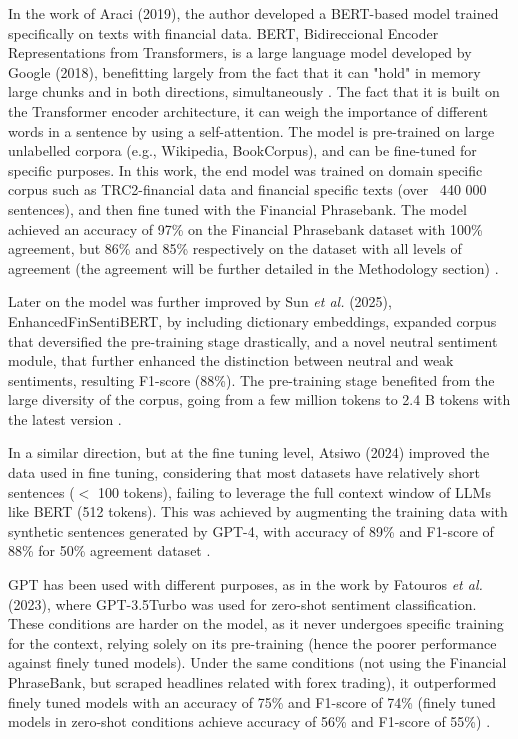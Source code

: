\documentclass[conference]{IEEEtran}
\begin{document}
In the work of Araci (2019), the author developed a BERT-based model trained specifically on texts with financial data. BERT, Bidireccional Encoder Representations from Transformers, is a large language model developed by Google (2018), benefitting largely from the fact that it can "hold" in memory large chunks and in both directions, simultaneously \cite{devlin2019bert}. The fact that it is built on the Transformer encoder architecture, it can weigh the importance of different words in a sentence by using a self-attention. The model is pre-trained  on large unlabelled corpora (e.g., Wikipedia, BookCorpus), and can be fine-tuned for specific purposes. In this work, the end model was trained on  domain specific corpus such as TRC2-financial data and financial specific texts (over ~440 000 sentences), and then fine tuned with the Financial Phrasebank. The model achieved an accuracy of 97\% on the Financial Phrasebank dataset with 100\% agreement, but 86\% and 85\% respectively on the dataset with all levels of agreement (the agreement will be further detailed in the Methodology section) \cite{araci2019finbert}. 

Later on the model was further improved by Sun \textit{et al.} (2025), EnhancedFinSentiBERT, by including dictionary embeddings, expanded corpus that deversified the pre-training stage drastically, and a novel neutral sentiment module, that further enhanced the distinction between neutral and weak sentiments, resulting F1-score (88\%). The pre-training stage benefited from the large diversity of the corpus, going from a few million tokens to 2.4 B tokens with the latest version \cite{sun2025financial}. %

In a similar direction, but at the fine tuning level, Atsiwo (2024) improved the data used in fine tuning, considering that most datasets have relatively short sentences ($<$ 100 tokens), failing to leverage the full context window  of LLMs like BERT (512 tokens). This was achieved by augmenting  the training data with synthetic sentences generated by GPT-4, with accuracy of 89\% and F1-score of 88\% for 50\% agreement dataset \cite{atsiwo2024financial}. 

GPT has been used with different purposes, as in the work by Fatouros \textit{et al.} (2023), where GPT-3.5Turbo was used for zero-shot sentiment classification. These conditions are harder on the model, as it never undergoes specific training for the context, relying solely on its pre-training (hence the poorer performance against finely tuned models). Under the same conditions (not using the Financial PhraseBank, but scraped headlines related with forex trading), it outperformed finely tuned models with an accuracy of 75\% and F1-score of 74\% (finely tuned models in zero-shot conditions achieve accuracy of 56\% and F1-score of 55\%) \cite{fatouros2023chatgpt}.
\end{document}
